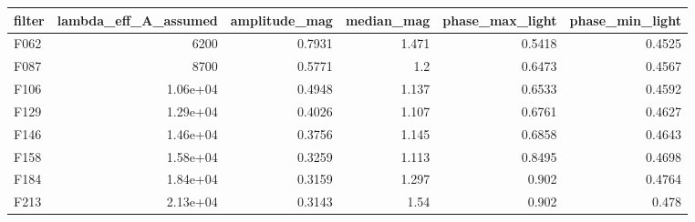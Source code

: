 \begin{tabular}{lrrrrr}
\toprule
filter & lambda_eff_A_assumed & amplitude_mag & median_mag & phase_max_light & phase_min_light \\
\midrule
F062 & 6200 & 0.7931 & 1.471 & 0.5418 & 0.4525 \\
F087 & 8700 & 0.5771 & 1.2 & 0.6473 & 0.4567 \\
F106 & 1.06e+04 & 0.4948 & 1.137 & 0.6533 & 0.4592 \\
F129 & 1.29e+04 & 0.4026 & 1.107 & 0.6761 & 0.4627 \\
F146 & 1.46e+04 & 0.3756 & 1.145 & 0.6858 & 0.4643 \\
F158 & 1.58e+04 & 0.3259 & 1.113 & 0.8495 & 0.4698 \\
F184 & 1.84e+04 & 0.3159 & 1.297 & 0.902 & 0.4764 \\
F213 & 2.13e+04 & 0.3143 & 1.54 & 0.902 & 0.478 \\
\bottomrule
\end{tabular}

